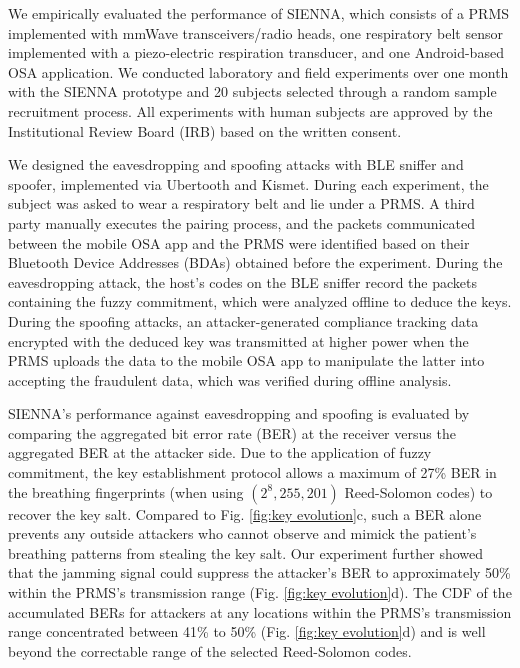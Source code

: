 We empirically evaluated the performance of SIENNA, which consists of a PRMS implemented with mmWave transceivers/radio heads, one respiratory belt sensor implemented with a piezo-electric respiration transducer, and one Android-based OSA application. We conducted laboratory and field experiments over one month with the SIENNA prototype and 20 subjects selected through a random sample recruitment process. All experiments with human subjects are approved by the Institutional Review Board (IRB) based on the written consent.

We designed the eavesdropping and spoofing attacks with BLE sniffer and spoofer, implemented via Ubertooth and Kismet. During each experiment, the subject was asked to wear a respiratory belt and lie under a PRMS. A third party manually executes the pairing process, and the packets communicated between the mobile OSA app and the PRMS were identified based on their Bluetooth Device Addresses (BDAs) obtained before the experiment. During the eavesdropping attack, the host's codes on the BLE sniffer record the packets containing the fuzzy commitment, which were analyzed offline to deduce the keys. During the spoofing attacks, an attacker-generated compliance tracking data encrypted with the deduced key was transmitted at higher power when the PRMS uploads the data to the mobile OSA app to manipulate the latter into accepting the fraudulent data, which was verified during offline analysis.

SIENNA's performance against eavesdropping and spoofing is evaluated by comparing the aggregated bit error rate (BER) at the receiver versus the aggregated BER at the attacker side. Due to the application of fuzzy commitment, the key establishment protocol allows a maximum of 27\% BER in the breathing fingerprints (when using $(2^8, 255, 201)$ Reed-Solomon codes) to recover the key salt. Compared to Fig. \ref{fig:key evolution}c, such a BER alone prevents any outside attackers who cannot observe and mimick the patient's breathing patterns from stealing the key salt. Our experiment further showed that the jamming signal could suppress the attacker's BER to approximately 50\% within the PRMS's transmission range (Fig. \ref{fig:key evolution}d). The CDF of the accumulated BERs for attackers at any locations within the PRMS's transmission range concentrated between 41\% to 50\% (Fig. \ref{fig:key evolution}d) and is well beyond the correctable range of the selected Reed-Solomon codes.


